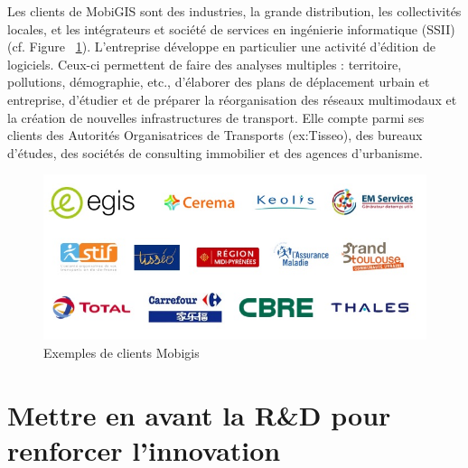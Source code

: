 Les clients de MobiGIS sont des industries, la grande distribution, les collectivités locales, et les intégrateurs et société de services en ingénierie informatique (SSII) (cf. Figure ~\ref{fig:fig2}). L’entreprise développe en particulier une activité d’édition de logiciels. Ceux-ci permettent de faire des analyses multiples : territoire, pollutions, démographie, etc., d’élaborer des plans de déplacement urbain et entreprise, d’étudier et de préparer la réorganisation des réseaux multimodaux et la création de nouvelles infrastructures de transport. Elle compte parmi ses clients des Autorités Organisatrices de Transports (ex:Tisseo), des bureaux d’études, des sociétés de consulting immobilier et des agences d’urbanisme.\\

\begin{figure}[!h]\label{fig:fig2}
\centering
\includegraphics[width=12cm]{images/fig2_referencesMobigis.JPG}
\caption{Exemples de clients Mobigis}
\end{figure} 

\section{Mettre en avant la R\&D pour renforcer l'innovation}


